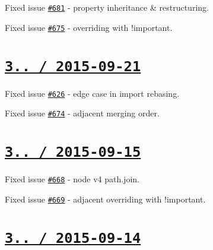 \begin{DoxyItemize}
\item Fixed issue \href{https://github.com/jakubpawlowicz/clean-css/issues/681}{\tt \#681} -\/ property inheritance \& restructuring.
\item Fixed issue \href{https://github.com/jakubpawlowicz/clean-css/issues/675}{\tt \#675} -\/ overriding with {\ttfamily !important}.
\end{DoxyItemize}

\section*{\href{https://github.com/jakubpawlowicz/clean-css/compare/v3.4.3...v3.4.4}{\tt 3.. / 2015-\/09-\/21} }


\begin{DoxyItemize}
\item Fixed issue \href{https://github.com/jakubpawlowicz/clean-css/issues/626}{\tt \#626} -\/ edge case in import rebasing.
\item Fixed issue \href{https://github.com/jakubpawlowicz/clean-css/issues/674}{\tt \#674} -\/ adjacent merging order.
\end{DoxyItemize}

\section*{\href{https://github.com/jakubpawlowicz/clean-css/compare/v3.4.2...v3.4.3}{\tt 3.. / 2015-\/09-\/15} }


\begin{DoxyItemize}
\item Fixed issue \href{https://github.com/jakubpawlowicz/clean-css/issues/668}{\tt \#668} -\/ node v4 path.\+join.
\item Fixed issue \href{https://github.com/jakubpawlowicz/clean-css/issues/669}{\tt \#669} -\/ adjacent overriding with {\ttfamily !important}.
\end{DoxyItemize}

\section*{\href{https://github.com/jakubpawlowicz/clean-css/compare/v3.4.1...v3.4.2}{\tt 3.. / 2015-\/09-\/14} }


